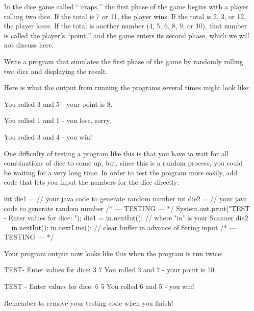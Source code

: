 \begin{exercise}
In the dice game called ```craps,'' the first phase of the game begins with a player rolling two dice.
If the total is 7 or 11, the player wins. If the total is 2, 3, or 12, the player loses. If the total is another number (4, 5, 6, 8, 9, or 10), that number is called the player's ``point,'' and the game enters its second phase, which we will not discuss here.

Write a program that simulates the first phase of the game by randomly rolling two dice and displaying the result.

Here is what the output from running the programs several times might look like:

\begin{stdout}
You rolled 3 and 5 - your point is 8.

You rolled 1 and 1 - you lose, sorry.

You rolled 3 and 4 - you win!
\end{stdout}

One difficulty of testing a program like this is that you have to wait for all combinations of dice to come up, but, since this is a random process, you could be waiting for a very long time. In order to test the program more easily, add code that lets you input the numbers for the dice directly:

\begin{code}
int die1 = // your java code to generate random number
int die2 = // your java code to generate random number
/* --- TESTING --- */
System.out.print("TEST - Enter values for dice: ");
die1 = in.nextInt(); // where "in" is your Scanner
die2 = in.nextInt();
in.nextLine(); // clear buffer in advance of String input
/* --- TESTING --- */
\end{code}

Your program output now looks like this when the program is run twice:

\begin{stdout}
TEST- Enter values for dice: 3 7
You rolled 3 and 7 - your point is 10.

TEST - Enter values for dice: 6 5
You rolled 6 and 5 - you win!
\end{stdout}

Remember to remove your testing code when you finish!

\end{exercise}

